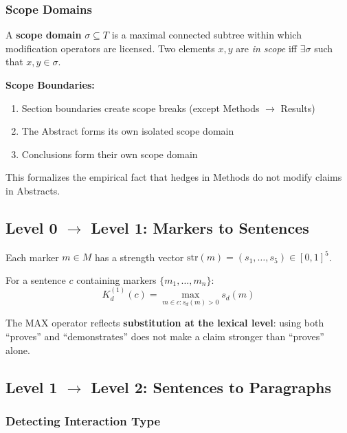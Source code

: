 \subsubsection{Scope Domains}

\begin{termbox}
A \textbf{scope domain} $\sigma \subseteq T$ is a maximal connected subtree within which modification operators are licensed. Two elements $x,y$ are \emph{in scope} iff $\exists \sigma$ such that $x,y \in \sigma$.

\textbf{Scope Boundaries:}
\begin{enumerate}
    \item Section boundaries create scope breaks (except Methods $\rightarrow$ Results)
    \item The Abstract forms its own isolated scope domain
    \item Conclusions form their own scope domain
\end{enumerate}
\end{termbox}

This formalizes the empirical fact that hedges in Methods do not modify claims in Abstracts.


\subsection{Level 0 $\rightarrow$ Level 1: Markers to Sentences}

Each marker $m \in M$ has a strength vector $\text{str}(m) = (s_1,\dots,s_5) \in [0,1]^5$.

For a sentence $c$ containing markers $\{m_1,\dots,m_n\}$:
\begin{equation}
K^{(1)}_d(c) = \max_{m \in c : s_d(m) > 0} s_d(m)
\end{equation}

The MAX operator reflects \textbf{substitution at the lexical level}: using both ``proves'' and ``demonstrates'' does not make a claim stronger than ``proves'' alone.


\subsection{Level 1 $\rightarrow$ Level 2: Sentences to Paragraphs}

\subsubsection{Detecting Interaction Type}

